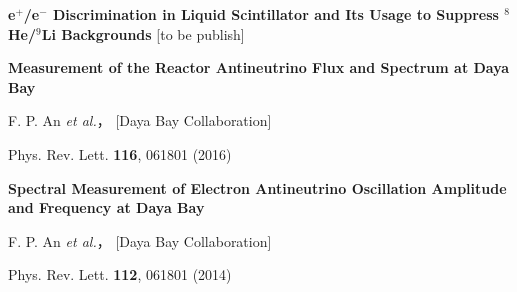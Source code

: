 \begin{publications}

{\bf e$^+$/e$^-$ Discrimination in Liquid Scintillator and Its Usage to Suppress $^8$He/$^9$Li Backgrounds }
[to be publish]


{\bf Measurement of the Reactor Antineutrino Flux and Spectrum at Daya Bay}

F. P. An {\it et al.}， [Daya Bay Collaboration]

Phys. Rev. Lett. {\bf 116}, 061801 (2016)


{\bf Spectral Measurement of Electron Antineutrino Oscillation Amplitude and Frequency at Daya Bay}

F. P. An {\it et al.}， [Daya Bay Collaboration]

Phys. Rev. Lett. {\bf 112}, 061801 (2014) 
\end{publications}

%
%
%
%
%
%
%
%
%

